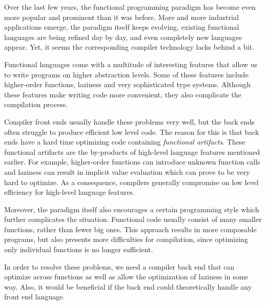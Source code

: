 \documentclass[main.tex]{subfiles}
\begin{document}
	
	Over the last few years, the functional programming paradigm has become even more popular and prominent than it was before. More and more industrial applications emerge, the paradigm itself keeps evolving, existing functional languages are being refined day by day, and even completely new languages appear. Yet, it seems the corresponding compiler technology lacks behind a bit.
	
	Functional languages come with a multitude of interesting features that allow us to write programs on higher abstraction levels. Some of these features include higher-order functions, laziness and very sophisticated type systems. Although these features make writing code more convenient, they also complicate the compilation process.
	
	Compiler front ends usually handle these problems very well, but the back ends often struggle to produce efficient low level code. The reason for this is that back ends have a hard time optimizing code containing \emph{functional artifacts}. These functional artifacts are the by-products of high-level language features mentioned earlier. For example, higher-order functions can introduce unknown function calls and laziness can result in implicit value evaluation which can prove to be very hard to optimize. As a consequence, compilers generally compromise on low level efficiency for high-level language features.
	
	Moreover, the paradigm itself also encourages a certain programming style which further complicates the situation. Functional code usually consist of many smaller functions, rather than fewer big ones. This approach results in more composable programs, but also presents more difficulties for compilation, since optimizing only individual functions is no longer sufficient. 
	
	In order to resolve these problems, we need a compiler back end that can optimize across functions as well as allow the optimization of laziness in some way. Also, it would be beneficial if the back end could theoretically handle any front end language.
	
\end{document}
